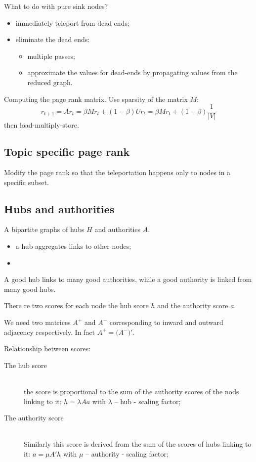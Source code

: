 \documentclass[a4paper]{article}
\newcommand{\abs}[1]{{\left | #1 \right |}}
\begin{document}
What to do with pure sink nodes?
\begin{itemize}
	\item immediately teleport from dead-ends;
	\item eliminate the dead ends: \begin{itemize}
		\item multiple passes;
		\item approximate the values for dead-ends by propagating values from the reduced graph.
	\end{itemize}
\end{itemize}

Computing the page rank matrix. Use sparsity of the matrix $M$:
\[r_{t+1} = A r_t = \beta M r_t + (1-\beta) U r_t = \beta M r_t + (1-\beta) \frac{1}{\abs{V}}\]
then load-multiply-store.

\subsection{Topic specific page rank} %
\label{sub:topic_specific_page_rank}

Modify the page rank so that the teleportation happens only to nodes in a specific subset.



\subsection{Hubs and authorities} %
\label{sub:hubs_and_authorities}

A bipartite graphs of hubs $H$ and authorities $A$.
\begin{itemize}
	\item a hub aggregates links to other nodes;
	\item 
\end{itemize}
A good hub links to many good authorities, while a good authority is linked from many good hubs.

There re two scores for each node the hub score $h$ and the authority score $a$.

We need two matrices $A^+$ and $A^-$ corresponding to inward and outward adjacency respectively.
In fact $A^+ = \big( A^- \big)'$.

Relationship between scores: \begin{description}
	\item[The hub score] \hfill\\
		the score is proportional to the sum of the authority scores of the nods linking to it:
		$h = \lambda A a$ with $\lambda$ -- hub - scaling factor;
	\item[The authority score] \hfill\\
		Similarly this score is derived from the sum of the scores of hubs linking to it:
		$a = \mu A' h$ with $\mu$ -- authority - scaling factor;
\end{description}
\end{document}
